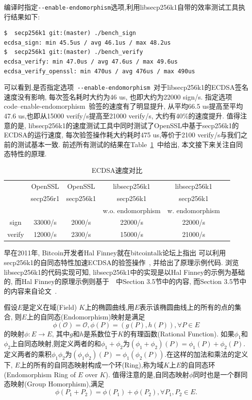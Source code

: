 \documentclass{article}
\newcommand{\code}[1]{\lstinline!#1!}
\begin{document}
编译时指定\code{--enable-endomorphism}选项,利用libsecp256k1自带的效率测试工具执行结果如下:

\begin{lstlisting}[caption=\texttt{libsecp256k1 benchmark with --enable-endomorphism}]
$  secp256k1 git:(master) ./bench_sign  
ecdsa_sign: min 45.5us / avg 46.1us / max 48.2us
$  secp256k1 git:(master) ./bench_verify 
ecdsa_verify: min 47.0us / avg 47.6us / max 49.6us
ecdsa_verify_openssl: min 470us / avg 476us / max 490us
\end{lstlisting}

可以看到,是否指定选项~\code{--enable-endomorphism}~对于libsecp256k1的ECDSA签名速度没有影响,
每次签名耗时大约为46 us, 也即大约为22000 sign/s. 指定选项~\\code{--enable-endomorphism}~验签的速度有了明显提升,
从平均66.5 us提高至平均47.6 us,也即从15000 verify/s提高至21000 verify/s, 大约有40\%的速度提升.
值得注意的是, libsecp256k1的速度测试工具中同时测试了OpenSSL中基于secp256k1的ECDSA的运行速度,
每次验签操作耗大约耗时475 us,等价于2100 verify/s与我们之前的测试基本一致.
前述所有测试的结果在Table~\ref{tbl-ecdsa-bench}~中给出, 本文接下来关注自同态特性的原理.

\begin{table}[h]
\centering
\caption{ECDSA速度对比}\label{tbl-ecdsa-bench}
\begin{tabular}{|c|c|c|c|c|c|}
\hline
\small
         & OpenSSL & OpenSSL & libsecp256k1 & libsecp256k1 \\
         & secp256r1 & secp256k1 & secp256k1  & secp256k1 \\
         &                 &                 & w.o. endomorphism & w. endomorphism \\\hline
 sign  & 33000/s  & 2000/s & 22000/s & 22000/s \\\hline
 verify & 12000/s & 2300/s & 15000/s & 21000/s \\\hline
\end{tabular}
\end{table}

早在2011年, Bitcoin开发者Hal Finney就在bitcointalk论坛上指出
可以利用secp256k1的自同态特性加速ECDSA的验签操作~\cite{halfinney}, 并给出了原理示例代码.
浏览libsecp256k1的代码实现可知, libsecp256k1中的实现是以Hal Finney的示例为基础的,
而Hal Finney的原理示例则基于~\cite{guidetoecc}~中Section 3.5节中的内容,
而Section 3.5节中的内容来自论文~\cite{glv01}.

假设$E$是定义在域(Field) $K$上的椭圆曲线,用$E$表示该椭圆曲线上的所有的点的集合,
则$E$上的自同态(Endomorphism)映射是满足
$$\phi(\mathcal{O}) = \mathcal{O}, \phi(P) = (g(P), h(P)), \forall P \in E$$
的映射$\phi: E \rightarrow E$, 其中$g$和$h$是系数位于$K$的有理函数(Rational Function).
如果$\phi_1$和$\phi_2$上自同态映射,则定义两者的和$\phi_1+\phi_2$为$(\phi_1+\phi_2)(P) = \phi_1(P) + \phi_2(P)$.
定义两者的乘积$\phi_1\phi_2$为$(\phi_1\phi_2)(P)=\phi_1(\phi_2(P))$.在这样的加法和乘法的定义下,
$E$上的所有的自同态映射构成一个环(Ring),称为域$K$上$E$的自同态环(Endomorphism Ring of $E$ over $K$).
值得注意的是,自同态映射$\phi$同时也是一个群同态映射(Group Homorphism),满足
$$\phi(P_1 + P_2) = \phi(P_1) + \phi(P_2), \forall P_1, P_2 \in E.$$
\end{document}
